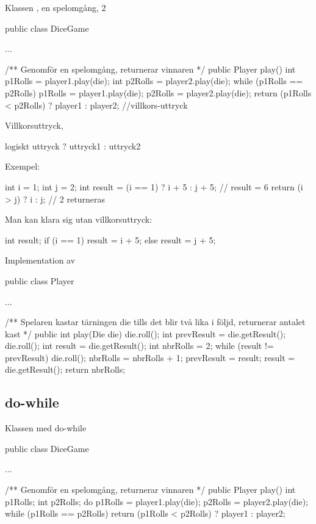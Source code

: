 \documentclass{lecturenotes}
\begin{document}
\begin{Slide}
{Klassen , en spelomgång, 2}
\begin{Code}
public class DiceGame {
    ...
    
    /** Genomför en spelomgång, returnerar vinnaren */
    public Player play() {
        int p1Rolls = player1.play(die);
        int p2Rolls = player2.play(die);
        while (p1Rolls == p2Rolls) {
            p1Rolls = player1.play(die);
            p2Rolls = player2.play(die);
        }
        return (p1Rolls < p2Rolls) ? player1 : player2;  //villkors-uttryck
    }
}
\end{Code}
\end{Slide} 

\begin{Slide}{Villkorsuttryck, }
\begin{Code}
logiskt uttryck ? uttryck1 : uttryck2
\end{Code}

Exempel:
\begin{Code}
int i = 1;
int j = 2;
int result = (i == 1) ? i + 5 : j + 5; // result = 6
return (i > j) ? i : j;                // 2 returneras
\end{Code}

Man kan klara sig utan villkorsuttryck:
\begin{Code}
int result;
if (i == 1) {
    result = i + 5;
} else {
    result = j + 5;
}
\end{Code}
\end{Slide} 

\begin{Slide}{Implementation av }
\begin{Code}
public class Player {
    ...
    
    /** Spelaren kastar tärningen die tills det blir 
        två lika i följd, returnerar antalet kast */
    public int play(Die die) {
        die.roll();
        int prevResult = die.getResult();
        die.roll();
        int result = die.getResult();
        int nbrRolls = 2;
        while (result != prevResult) {
            die.roll();
            nbrRolls = nbrRolls + 1;
            prevResult = result;
            result = die.getResult();
        }
        return nbrRolls;
    }
}
\end{Code}
\end{Slide} 


\subsection{do-while}
\begin{Slide}
{Klassen  med do-while}
\begin{Code}
public class DiceGame {
    ...
    
    /** Genomför en spelomgång, returnerar vinnaren */
    public Player play() {
        int p1Rolls;
        int p2Rolls;
        do  {
            p1Rolls = player1.play(die);
            p2Rolls = player2.play(die);
        } while (p1Rolls == p2Rolls)
        return (p1Rolls < p2Rolls) ?  player1 : player2;
    }
}
\end{Code}
\end{Slide} 
\end{document}
